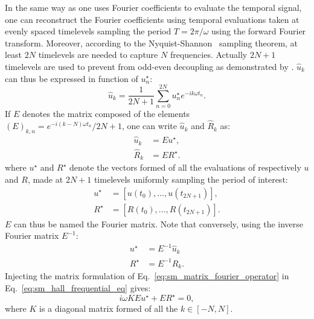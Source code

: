 In the same way as one uses Fourier coefficients to
evaluate the temporal signal,
one can reconstruct the Fourier coefficients using
temporal evaluations taken at evenly spaced timelevels
sampling the period $T = 2 \pi / \omega$ using the forward
Fourier transform. Moreover, 
according to the Nyquist-Shannon~\cite{Shannon1949} sampling theorem, 
at least $2N$ timelevels are needed to capture $N$ frequencies. Actually
$2N+1$ timelevels are used to prevent from odd-even decoupling as
demonstrated by \citet{Weide2005}. $\widehat{u}_k$ can thus
be expressed in function of $u_n^\star$:
\begin{equation}
	\widehat{u}_k = \frac{1}{2N+1} 
	\sum_{n=0}^{2N} u_n^\star e^{-i k \omega t_n}.
\end{equation}
If $E$ denotes the matrix composed of the elements 
$(E)_{k,n} = e^{-i (k - N) \omega t_n} / 2N+1$, one can write $\widehat{u}_k$
and $\widehat{R}_k$ as:
\begin{equation}
	\begin{split}
		\widehat{u}_k &= E u^\star, \\
		\widehat{R}_k &= E R^\star.
	\end{split}
	\label{eq:sm_matrix_fourier_operator}
\end{equation}
where $u^\star$ and $R^\star$ 
denote the vectors formed of all the evaluations of respectively $u$
and $R$,
made at $2N+1$ timelevels uniformly sampling the period of interest:
\begin{equation}
	\begin{split}
		u^\star &= [u(t_0), \ldots, u(t_{2N+1})], \\
		R^\star &= [R(t_0), \ldots, R(t_{2N+1})].
	\end{split}
\end{equation}
$E$ can thus be named the Fourier matrix.
Note that conversely, using the inverse Fourier matrix $E^{-1}$:
\begin{equation}
	\begin{split}
		u^\star &= E^{-1} \widehat{u}_k \\
		R^\star &= E^{-1} \widehat{R}_k.
	\end{split}
\end{equation}
Injecting the matrix formulation of 
Eq.~\ref{eq:sm_matrix_fourier_operator} in 
Eq.~\ref{eq:sm_hall_frequential_eq}
gives:
\begin{equation}
	i \omega K E u^\star + E R^\star = 0,
\end{equation}
where $K$ is a diagonal matrix formed of all the $k \in [-N, N]$.
